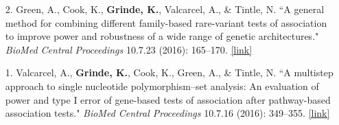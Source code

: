 \documentclass[margin]{res}
\newcommand{\annotateItem}[1]{
	\begin{itemize} \vspace{-0.1cm}
	\item[] 
	\begin{footnotesize}\textcolor{black}{(#1)}\end{footnotesize}
	\end{itemize} \vspace{-0.1cm}
}
\begin{document}
\begin{resume}
\begin{itemize}
\item[2.] Green, A., Cook, K., \textbf{Grinde, K.}, Valcarcel, A., \& Tintle, N. ``A general method for combining different family-based rare-variant tests of association to improve power and robustness of a wide range of genetic architectures." \textit{BioMed Central Proceedings} 10.7.23 (2016): 165--170.
\href{https://bmcproc.biomedcentral.com/articles/10.1186/s12919-016-0024-y}{[link]}
	
\item[1.] Valcarcel, A., \textbf{Grinde, K.}, Cook, K., Green, A., \& Tintle, N. ``A multistep approach to single nucleotide polymorphism--set analysis: An evaluation of power and type I error of gene-based tests of association after pathway-based association tests." \textit{BioMed Central Proceedings} 10.7.16 (2016): 349--355.  %
\href{https://bmcproc.biomedcentral.com/articles/10.1186/s12919-016-0055-4}{[link]}

\end{itemize}
	

\end{resume}
\end{document}
